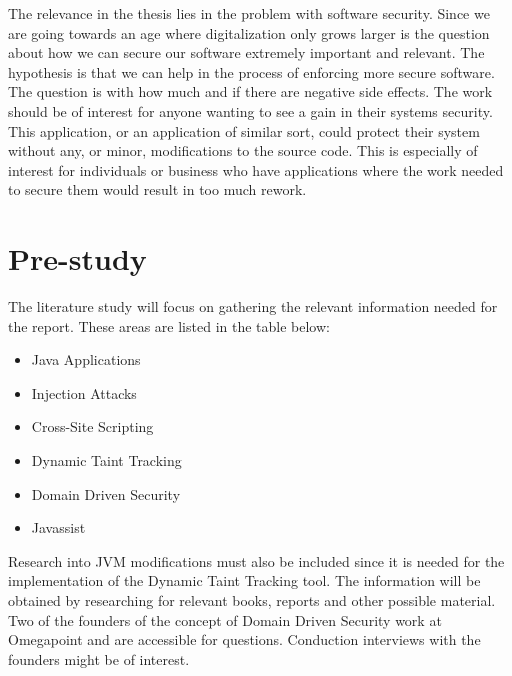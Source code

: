 \documentclass{../kththesis}
\begin{document}
	The relevance in the thesis lies in the problem with software security. Since we are going towards an age where digitalization only grows larger is the question about how we can secure our software extremely important and relevant. The hypothesis is that we can help in the process of enforcing more secure software. The question is with how much and if there are negative side effects. The work should be of interest for anyone wanting to see a gain in their systems security. This application, or an application of similar sort, could protect their system without any, or minor, modifications to the source code. This is especially of interest for individuals or business who have applications where the work needed to secure them would result in too much rework.
	
	
	
	\chapter{Pre-study} \label{Pre-study}
	The literature study will focus on gathering the relevant information needed for the report. These areas are listed in the table below:
		
		\begin{itemize}  
			\item Java Applications
			\item Injection Attacks
			\item Cross-Site Scripting
			\item Dynamic Taint Tracking
			\item Domain Driven Security
			\item Javassist
		\end{itemize}
	
	\noindent
	Research into JVM modifications must also be included since it is needed for the implementation of the Dynamic Taint Tracking tool. The information will be obtained by researching for relevant books, reports and other possible material. Two of the founders of the concept of Domain Driven Security work at Omegapoint and are accessible for questions. Conduction interviews with the founders might be of interest.
	
\end{document}
